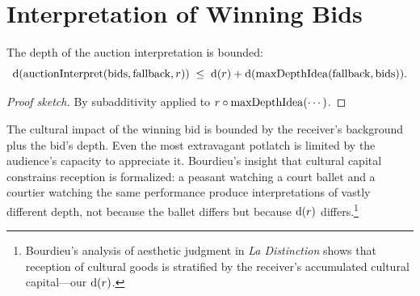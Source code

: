 \section{Interpretation of Winning Bids}
\label{sec:ch14-interp}

\begin{theorem}
\label{thm:winner-bound}
The depth of the auction interpretation is bounded:
\[
  \operatorname{d}(\operatorname{auctionInterpret}(\text{bids}, \text{fallback}, r))
  \;\le\;
  \operatorname{d}(r) + \operatorname{d}(\operatorname{maxDepthIdea}(\text{fallback}, \text{bids})).
\]
\end{theorem}

\begin{proof}[Proof sketch]
By subadditivity applied to $r \circ \operatorname{maxDepthIdea}(\cdots)$.
\end{proof}

The cultural impact of the winning bid is bounded by the receiver's
background plus the bid's depth.  Even the most extravagant potlatch is
limited by the audience's capacity to appreciate it.  Bourdieu's insight
that cultural capital constrains reception is formalized: a peasant
watching a court ballet and a courtier watching the same performance
produce interpretations of vastly different depth, not because the ballet
differs but because $\operatorname{d}(r)$ differs.\footnote{Bourdieu's analysis of
aesthetic judgment in \textit{La Distinction} shows that reception of
cultural goods is stratified by the receiver's accumulated cultural
capital---our $\operatorname{d}(r)$.}

